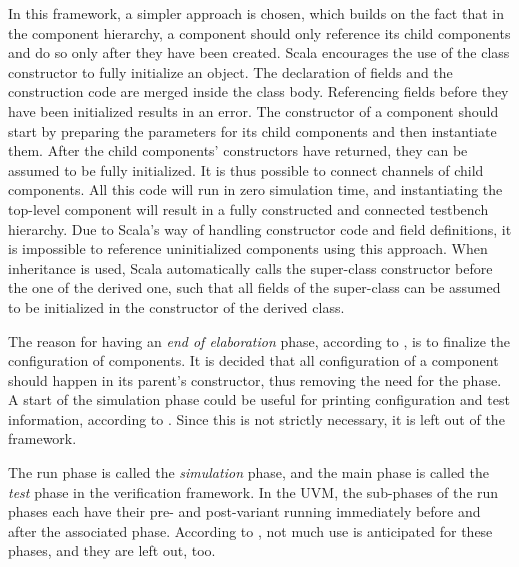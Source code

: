 In this framework, a simpler approach is chosen, which builds on the fact that in the component hierarchy, a component
should only reference its child components and do so only after they have been created. Scala encourages the use of
the class constructor to fully initialize an object. The declaration of fields and the construction code are merged
inside the class body. Referencing fields before they have been initialized results in an error. The constructor of a
component should start by preparing the parameters for its child components and then instantiate them. After the
child components' constructors have returned, they can be assumed to be fully initialized. It is thus possible to
connect channels of child components. All this
code will run in zero simulation time, and instantiating the top-level component will result in a fully constructed
and connected testbench hierarchy. Due to Scala's way of handling constructor code and field definitions, it is
impossible to reference uninitialized components using this approach. When inheritance is used, Scala automatically
calls the super-class constructor before the one of the derived one, such that all fields of the super-class can be
assumed to be initialized in the constructor of the derived class.

The reason for having an \textit{end of elaboration} phase, according to \cite[Ch 4.6]{mehta2018asic}, is to finalize
the configuration of components. It is decided that all configuration of a component should happen in its parent's constructor, thus removing the need for the phase. A start of the simulation phase could be useful for printing
configuration and test information, according to \cite[4.6]{mehta2018asic}. Since this is not strictly
necessary, it is left out of the framework.

The run phase is called the \textit{simulation} phase, and the main phase is called the \textit{test} phase in the
verification framework. In the UVM, the sub-phases of the run phases each have their pre- and post-variant running
immediately before and
after the associated phase. According to \cite[Ch 4.6]{mehta2018asic}, not much use is anticipated for these phases, and they are left out, too.

